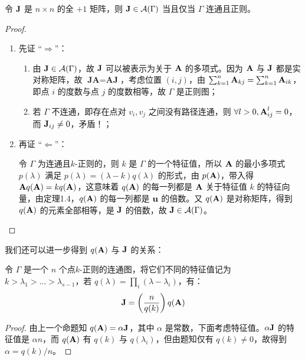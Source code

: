 \begin{proposition}[Hoffman 1963]
令 $\textbf J$ 是 $n\times n$ 的全 $+1$ 矩阵，则 $\textbf J \in \mathcal A(\Gamma)$ 当且仅当 $\Gamma$ 连通且正则。
\end{proposition}
\begin{proof}
\begin{enumerate}
\item 先证 “$\Rightarrow$”：
\begin{enumerate}
\item 由 $\textbf J \in \mathcal A(\Gamma)$，故 $\textbf J$ 可以被表示为关于 $\textbf A$ 的多项式。因为 $\textbf A$ 与 $\textbf J$ 都是实对称矩阵，故 $\textbf {JA} = \textbf {AJ}$，考虑位置 $(i,j)$，由 $\sum_{k = 1}^n \textbf A_{kj} = \sum_{k = 1}^n \textbf A_{ik}$，即点 $i$ 的度数与点 $j$ 的度数相等，故 $\Gamma$ 是正则图；
\item 若 $\Gamma$ 不连通，即存在点对 ${v_i, v_j}$ 之间没有路径连通，则 $\forall l > 0, \textbf A^l_{ij} = 0$，而 $\textbf J_{ij} \neq 0$，矛盾！；
\end{enumerate}
\item 再证 “$\Leftarrow$”：

令 $\Gamma$ 为连通且$k$-正则的，则 $k$ 是 $\Gamma$ 的一个特征值，所以 $\textbf A$ 的最小多项式 $p(\lambda)$ 满足 $p(\lambda) = (\lambda - k) q(\lambda)$ 的形式，由 $p(\textbf A)$，带入得 $\textbf A q(\textbf A) = kq(\textbf A)$，这意味着 $q(\textbf A)$ 的每一列都是 $\textbf A$ 关于特征值 $k$ 的特征向量，由定理1.4，$q(\textbf A)$ 的每一列都是 $\textbf u$ 的倍数。又 $q(\textbf A)$ 是对称矩阵，得到 $q(\textbf A)$ 的元素全部相等，是 $\textbf J$ 的倍数，故 $\textbf J \in \mathcal A(\Gamma)$。
\end{enumerate}
\end{proof}

我们还可以进一步得到 $q(\textbf A)$ 与 $\textbf J$ 的关系：

\begin{proposition}
令 $\Gamma$ 是一个 $n$ 个点$k$-正则的连通图，将它们不同的特征值记为 $k > \lambda_1 > \dots > \lambda_{s - 1}$，若 $q(\lambda) = \prod_i (\lambda - \lambda_i)$，有：
\[
\textbf J = \left(\frac {n} {q(k)}\right) q(\textbf A)
\]
\end{proposition}

\begin{proof}
由上一个命题知 $q(\textbf A) = \alpha \textbf J$，其中 $\alpha$ 是常数，下面考虑特征值。$\alpha \textbf J$ 的特征值是 $\alpha n$，而 $q(\textbf A)$ 有 $q(k)$ 与 $q(\lambda_i)$，但由题知仅有 $q(k) \neq 0$，故得到 $\alpha = q(k) / n$。
\end{proof}

